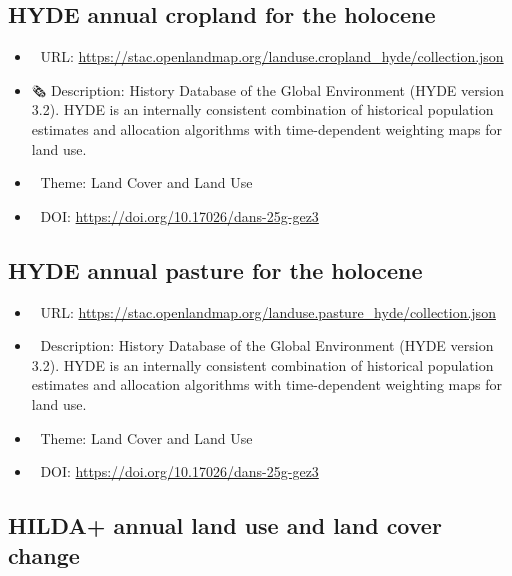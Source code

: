 \documentclass[
  graybox,natbib,nospthms]{svmono}
\providecommand{\tightlist}{%
  \setlength{\itemsep}{0pt}\setlength{\parskip}{0pt}}
\providecommand{\tightlist}{\setlength{\itemsep}{0pt}\setlength{\parskip}{0pt}}
\begin{document}
\hypertarget{hyde-annual-cropland-for-the-holocene}{%
\subsection{HYDE annual cropland for the holocene}\label{hyde-annual-cropland-for-the-holocene}}

\begin{itemize}
\tightlist
\item
  🔗 URL: \url{https://stac.openlandmap.org/landuse.cropland_hyde/collection.json}
\item
  🗞 Description: History Database of the Global Environment (HYDE version 3.2). HYDE is an internally consistent combination of historical population estimates and allocation algorithms with time-dependent weighting maps for land use.
\item
  📝 Theme: Land Cover and Land Use
\item
  📂 DOI: \url{https://doi.org/10.17026/dans-25g-gez3}
\end{itemize}

\hypertarget{hyde-annual-pasture-for-the-holocene}{%
\subsection{HYDE annual pasture for the holocene}\label{hyde-annual-pasture-for-the-holocene}}

\begin{itemize}
\tightlist
\item
  🔗 URL: \url{https://stac.openlandmap.org/landuse.pasture_hyde/collection.json}
\item
  📰 Description: History Database of the Global Environment (HYDE version 3.2). HYDE is an internally consistent combination of historical population estimates and allocation algorithms with time-dependent weighting maps for land use.
\item
  📝 Theme: Land Cover and Land Use
\item
  📂 DOI: \url{https://doi.org/10.17026/dans-25g-gez3}
\end{itemize}

\hypertarget{hilda-annual-land-use-and-land-cover-change}{%
\subsection{HILDA+ annual land use and land cover change}\label{hilda-annual-land-use-and-land-cover-change}}
\end{document}
